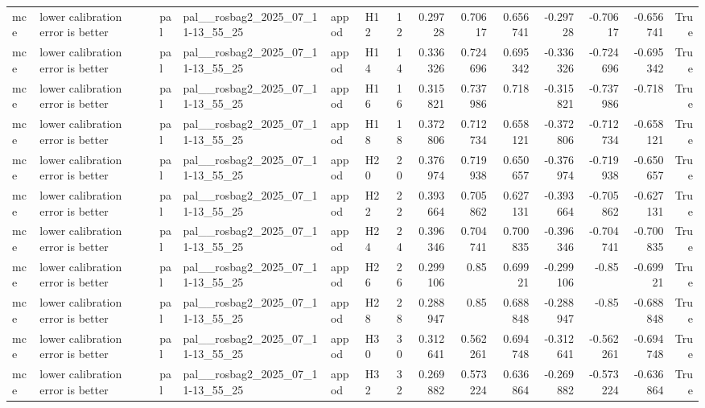 \begin{longtable}{llllllrrrrrrrr}
mce & lower calibration error is better & pal & pal\_\_rosbag2\_2025\_07\_11-13\_55\_25 & appod & H12 & 12 & 0.29728 & 0.70617 & 0.656741 & -0.29728 & -0.70617 & -0.656741 & True \\
mce & lower calibration error is better & pal & pal\_\_rosbag2\_2025\_07\_11-13\_55\_25 & appod & H14 & 14 & 0.336326 & 0.724696 & 0.695342 & -0.336326 & -0.724696 & -0.695342 & True \\
mce & lower calibration error is better & pal & pal\_\_rosbag2\_2025\_07\_11-13\_55\_25 & appod & H16 & 16 & 0.315821 & 0.737986 & 0.718 & -0.315821 & -0.737986 & -0.718 & True \\
mce & lower calibration error is better & pal & pal\_\_rosbag2\_2025\_07\_11-13\_55\_25 & appod & H18 & 18 & 0.372806 & 0.712734 & 0.658121 & -0.372806 & -0.712734 & -0.658121 & True \\
mce & lower calibration error is better & pal & pal\_\_rosbag2\_2025\_07\_11-13\_55\_25 & appod & H20 & 20 & 0.376974 & 0.719938 & 0.650657 & -0.376974 & -0.719938 & -0.650657 & True \\
mce & lower calibration error is better & pal & pal\_\_rosbag2\_2025\_07\_11-13\_55\_25 & appod & H22 & 22 & 0.393664 & 0.705862 & 0.627131 & -0.393664 & -0.705862 & -0.627131 & True \\
mce & lower calibration error is better & pal & pal\_\_rosbag2\_2025\_07\_11-13\_55\_25 & appod & H24 & 24 & 0.396346 & 0.704741 & 0.700835 & -0.396346 & -0.704741 & -0.700835 & True \\
mce & lower calibration error is better & pal & pal\_\_rosbag2\_2025\_07\_11-13\_55\_25 & appod & H26 & 26 & 0.299106 & 0.85 & 0.69921 & -0.299106 & -0.85 & -0.69921 & True \\
mce & lower calibration error is better & pal & pal\_\_rosbag2\_2025\_07\_11-13\_55\_25 & appod & H28 & 28 & 0.288947 & 0.85 & 0.688848 & -0.288947 & -0.85 & -0.688848 & True \\
mce & lower calibration error is better & pal & pal\_\_rosbag2\_2025\_07\_11-13\_55\_25 & appod & H30 & 30 & 0.312641 & 0.562261 & 0.694748 & -0.312641 & -0.562261 & -0.694748 & True \\
mce & lower calibration error is better & pal & pal\_\_rosbag2\_2025\_07\_11-13\_55\_25 & appod & H32 & 32 & 0.269882 & 0.573224 & 0.636864 & -0.269882 & -0.573224 & -0.636864 & True \\
\end{longtable}
